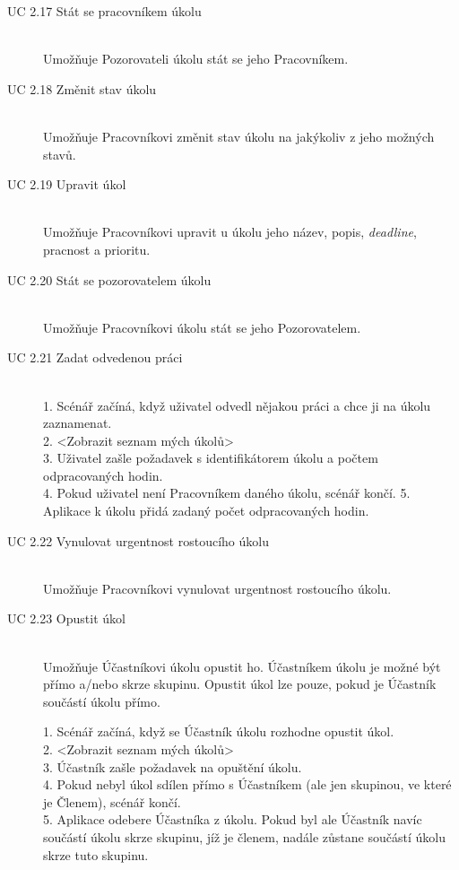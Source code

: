\documentclass[thesis=B,czech]{FITthesis}[2012/06/26]
\begin{document}
\begin{description}
				
				\item[UC 2.17 Stát se pracovníkem úkolu] \hfill \\
					Umožňuje Pozorovateli úkolu stát se jeho Pracovníkem.				
								
				\item[UC 2.18 Změnit stav úkolu] \hfill \\
					Umožňuje Pracovníkovi změnit stav úkolu na jakýkoliv z jeho možných stavů.
				
				\item[UC 2.19 Upravit úkol] \hfill \\
					Umožňuje Pracovníkovi upravit u úkolu jeho název, popis, \textit{deadline}, pracnost a prioritu.
				
				\item[UC 2.20 Stát se pozorovatelem úkolu] \hfill \\
					Umožňuje Pracovníkovi úkolu stát se jeho Pozorovatelem.
					
				\item[UC 2.21 Zadat odvedenou práci] \hfill \\
					1. Scénář začíná, když uživatel odvedl nějakou práci a chce ji na úkolu zaznamenat. \\
					2. <Zobrazit seznam mých úkolů> \\
					3. Uživatel zašle požadavek s identifikátorem úkolu a počtem odpracovaných hodin. \\
					4. Pokud uživatel není Pracovníkem daného úkolu, scénář končí.
					5. Aplikace k úkolu přidá zadaný počet odpracovaných hodin. \\
					
				\item[UC 2.22 Vynulovat urgentnost rostoucího úkolu] \hfill \\
					Umožňuje Pracovníkovi vynulovat urgentnost rostoucího úkolu.
					
				\item[UC 2.23 Opustit úkol] \hfill \\
					Umožňuje Účastníkovi úkolu opustit ho. Účastníkem úkolu je možné být přímo a/nebo skrze skupinu. Opustit úkol lze pouze, pokud je Účastník součástí úkolu přímo.
				
					1. Scénář začíná, když se Účastník úkolu rozhodne opustit úkol. \\
					2. <Zobrazit seznam mých úkolů> \\
					3. Účastník zašle požadavek na opuštění úkolu. \\
					4. Pokud nebyl úkol sdílen přímo s Účastníkem (ale jen skupinou, ve které je Členem), scénář končí. \\
					5. Aplikace odebere Účastníka z úkolu. Pokud byl ale Účastník navíc součástí úkolu skrze skupinu, jíž je členem, nadále zůstane součástí úkolu skrze tuto skupinu.
			\end{description}
			
\end{document}
